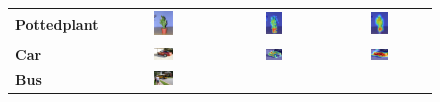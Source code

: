 \begin{figure}[ht]
\begin{tcolorbox}[colframe=black!60, colback=white, boxrule=0.8pt, arc=2pt, left=2pt, right=2pt, top=2pt, bottom=2pt]
\begin{tabular}{m{3cm} c c c}
    \\
    \textbf{Pottedplant}
    & \includegraphics[width=0.18\textwidth,height=0.18\textwidth]{figures/originals/2011_000145}
    & \includegraphics[width=0.18\textwidth,height=0.18\textwidth]{figures/val_cams/weclip/2011_000145_15}
    & \includegraphics[width=0.18\textwidth,height=0.18\textwidth]{figures/val_cams/ours/2011_000145_15}
    \\
    \textbf{Car}
    & \includegraphics[width=0.18\textwidth,height=0.18\textwidth]{figures/originals/2010_005119}
    & \includegraphics[width=0.18\textwidth,height=0.18\textwidth]{figures/val_cams/weclip/2010_005119_6}
    & \includegraphics[width=0.18\textwidth,height=0.18\textwidth]{figures/val_cams/ours/2010_005119_6}
    \\
    \textbf{Bus}
    & \includegraphics[width=0.18\textwidth,height=0.18\textwidth]{figures/originals/2010_000148}

\end{tabular}
\end{tcolorbox}
\end{figure}

